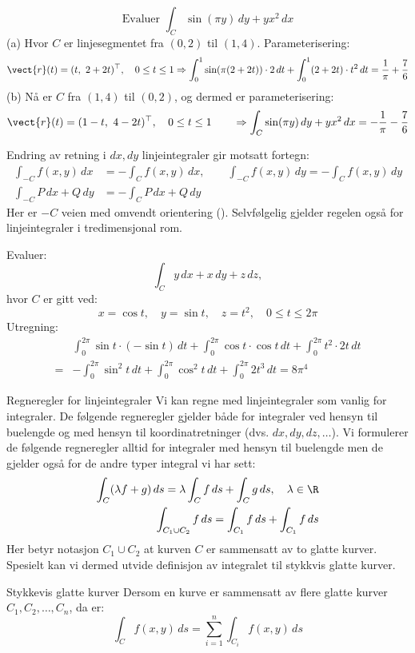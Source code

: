 \begin{eks}{}
\[\text{Evaluer }\int_C \sin(\pi y)\, dy + yx^2\, dx\]
(a) Hvor \( C \) er linjesegmentet fra \( (0,2) \) til \( (1,4) \). Parameterisering:
\[
\vect{r}(t) = ( t,\ 2 + 2t )^\top,\quad 0 \leq t \leq 1 \Rightarrow 
\int_0^1 \sin(\pi(2 + 2t)) \cdot 2\, dt + \int_0^1 (2 + 2t) \cdot t^2\, dt = \frac{1}{\pi} + \frac{7}{6}
\]
(b) Nå er $C$ fra \( (1,4) \) til \( (0,2) \), og dermed er parameterisering:
\[
\vect{r}(t) = ( 1 - t,\ 4 - 2t )^\top,\quad 0 \leq t \leq 1 \qquad \Rightarrow \int_C \sin(\pi y)\, dy + yx^2\, dx = - \frac{1}{\pi} - \frac{7}{6}
\]
\end{eks}
\begin{rem}{}
Endring av retning i $dx,dy$ linjeintegraler gir motsatt fortegn:
\begin{align*}
\int_{-C} f(x,y)\, dx &= -\int_C f(x,y)\, dx, \qquad \int_{-C} f(x,y)\, dy = -\int_C f(x,y)\, dy \\
\int_{-C} P\, dx + Q\, dy &= -\int_C P\, dx + Q\, dy
\end{align*}
Her er $-C$ veien med omvendt orientering ().
Selvfølgelig gjelder regelen også for linjeintegraler i tredimensjonal rom.
\end{rem}



\begin{eks}{}
Evaluer:
\[
\int_C y\, dx + x\, dy + z\, dz,
\]
hvor \( C \) er gitt ved:
\[
x = \cos t,\quad y = \sin t,\quad z = t^2,\quad 0 \leq t \leq 2\pi
\]
Utregning:
\begin{align*}
&\int_0^{2\pi} \sin t \cdot (-\sin t)\, dt + \int_0^{2\pi} \cos t \cdot \cos t\, dt + \int_0^{2\pi} t^2 \cdot 2t\, dt\\
=& -\int_0^{2\pi} \sin^2 t\, dt + \int_0^{2\pi} \cos^2 t\, dt + \int_0^{2\pi} 2t^3\, dt = 8\pi^4
\end{align*}
\end{eks}

\begin{oppsum}{Regneregler for linjeintegraler}
  Vi kan regne med linjeintegraler som vanlig for integraler.
  De følgende regneregler gjelder både for integraler ved hensyn til buelengde og med hensyn til koordinatretninger (dvs. $dx , dy, dz, \ldots$).  Vi formulerer de følgende regneregler alltid for integraler med hensyn til buelengde men de gjelder også for de andre typer integral vi har sett:
  \begin{align}
  \int_C (\lambda f+g)\, ds = \lambda \int_C f \, ds + \int_C g \, ds, \quad \lambda \in \R \label{lin_int_linear}\\
  \int_{C_1 \cup C_2} f \, ds = \int_{C_1} f \, ds + \int_{C_1} f \, ds \label{lin_int_add}
  \end{align}
  Her betyr notasjon $C_1\cup C_2$ at kurven $C$ er sammensatt av to glatte kurver. Spesielt kan vi dermed utvide definisjon av integralet til stykkvis glatte kurver.
\end{oppsum}
\begin{rem}{Stykkevis glatte kurver}
Dersom en kurve er sammensatt av flere glatte kurver \( C_1, C_2, \ldots, C_n \), da er:
\[
\int_C f(x, y)\, ds = \sum_{i=1}^n \int_{C_i} f(x, y)\, ds
\]
\end{rem}

